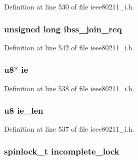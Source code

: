 Definition at line 530 of file ieee80211\-\_\-i.\-h.

\hypertarget{structieee80211__if__ibss_a0557131126944ea730092a4df84149d7}{
\subsubsection[{ibss\-\_\-join\-\_\-req}]{\setlength{\rightskip}{0pt plus 5cm}unsigned long ibss\-\_\-join\-\_\-req}}\label{structieee80211__if__ibss_a0557131126944ea730092a4df84149d7}


Definition at line 542 of file ieee80211\-\_\-i.\-h.

\hypertarget{structieee80211__if__ibss_a837e19ab2bc08b5dec813ad916a6f09d}{
\subsubsection[{ie}]{\setlength{\rightskip}{0pt plus 5cm}u8$\ast$ ie}}\label{structieee80211__if__ibss_a837e19ab2bc08b5dec813ad916a6f09d}


Definition at line 538 of file ieee80211\-\_\-i.\-h.

\hypertarget{structieee80211__if__ibss_a8e143706c80e5faf90dc4a385c4517f6}{
\subsubsection[{ie\-\_\-len}]{\setlength{\rightskip}{0pt plus 5cm}u8 ie\-\_\-len}}\label{structieee80211__if__ibss_a8e143706c80e5faf90dc4a385c4517f6}


Definition at line 537 of file ieee80211\-\_\-i.\-h.

\hypertarget{structieee80211__if__ibss_a8356eead4fd0be0edf4ea2e0237a4de8}{
\subsubsection[{incomplete\-\_\-lock}]{\setlength{\rightskip}{0pt plus 5cm}spinlock\-\_\-t incomplete\-\_\-lock}}\label{structieee80211__if__ibss_a8356eead4fd0be0edf4ea2e0237a4de8}



